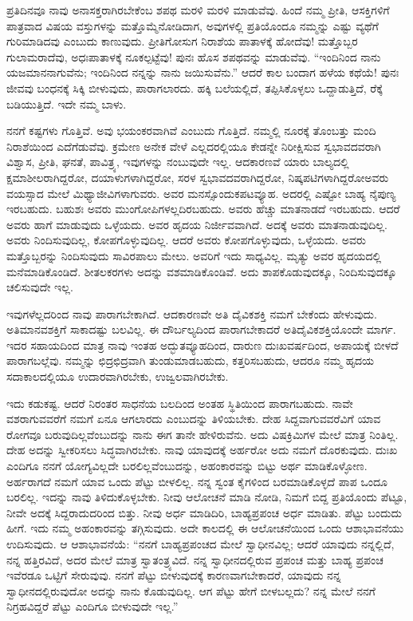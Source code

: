 ಪ್ರತಿದಿನವೂ ನಾವು ಅನಾಸಕ್ತರಾಗಿರಬೇಕೆಂಬ ಶಪಥ ಮರಳಿ ಮರಳಿ ಮಾಡುವೆವು. ಹಿಂದೆ ನಮ್ಮ ಪ್ರೀತಿ, ಆಸಕ್ತಿಗಳಿಗೆ ಪಾತ್ರವಾದ ವಿಷಯ ವಸ್ತುಗಳನ್ನು ಮತ್ತೊಮ್ಮೆ\break ನೋಡಿದಾಗ, ಅವುಗಳಲ್ಲಿ ಪ್ರತಿಯೊಂದೂ ನಮ್ಮನ್ನು ಎಷ್ಟು ವ್ಯಥೆಗೆ ಗುರಿಮಾಡಿದವು ಎಂಬುದು ಕಾಣುವುದು. ಪ್ರೀತಿಗೋಸುಗ ನಿರಾಶೆಯ ಪಾತಾಳಕ್ಕೆ ಹೋದೆವು! ಮತ್ತೊಬ್ಬರ ಗುಲಾಮರಾದೆವು, ಅಧಃಪಾತಾಳಕ್ಕೆ ನೂಕಲ್ಪಟ್ಟೆವು! ಪುನಃ ಹೊಸ ಶಪಥವನ್ನು ಮಾಡುವೆವು. “ಇಂದಿನಿಂದ ನಾನು ಯಜಮಾನನಾಗುವೆನು; ಇಂದಿನಿಂದ ನನ್ನನ್ನು ನಾನು ಜಯಿಸುವೆನು.'' ಆದರೆ ಕಾಲ ಬಂದಾಗ ಹಳೆಯ ಕಥೆಯೆ! ಪುನಃ ಜೀವವು ಬಂಧನಕ್ಕೆ ಸಿಕ್ಕಿ ಬೀಳುವುದು, ಪಾರಾಗಲಾರದು. ಹಕ್ಕಿ ಬಲೆಯಲ್ಲಿದೆ, ತಪ್ಪಿಸಿಕೊಳ್ಳಲು ಒದ್ದಾಡುತ್ತಿದೆ, ರೆಕ್ಕೆ ಬಡಿಯುತ್ತಿದೆ. ಇದೇ ನಮ್ಮ ಬಾಳು.

ನನಗೆ ಕಷ್ಟಗಳು ಗೊತ್ತಿವೆ. ಅವು ಭಯಂಕರವಾಗಿವೆ ಎಂಬುದು ಗೊತ್ತಿದೆ. ನಮ್ಮಲ್ಲಿ ನೂರಕ್ಕೆ ತೊಂಬತ್ತು ಮಂದಿ ನಿರಾಶೆಯಿಂದ ಎದೆಗೆಡುವೆವು. ಕ್ರಮೇಣ ಅನೇಕ ವೇಳೆ ಎಲ್ಲದರಲ್ಲಿಯೂ ಕೇಡನ್ನೇ ನಿರೀಕ್ಷಿಸುವ ಸ್ವಭಾವದವರಾಗಿ ವಿಶ್ವಾಸ, ಪ್ರೀತಿ, ಘನತೆ, ಪಾವಿತ್ರ್ಯ, ಇವುಗಳನ್ನು ನಂಬುವುದೇ ಇಲ್ಲ. ಆದಕಾರಣವೆ ಯಾರು ಬಾಲ್ಯದಲ್ಲಿ ಕ್ಷಮಾಶೀಲರಾಗಿದ್ದರೋ, ದಯಾಳುಗಳಾಗಿದ್ದರೋ, ಸರಳ ಸ್ವಭಾವದವರಾಗಿದ್ದರೋ, ನಿಷ್ಕಪಟಿಗಳಾಗಿದ್ದರೋ\break ಅವರು ವಯಸ್ಸಾದ ಮೇಲೆ ಮಿಥ್ಯಾಜೀವಿಗಳಾಗುವರು. ಅವರ ಮನಸ್ಸೊಂದು\break ಕಪಟವ್ಯೂಹ. ಅದರಲ್ಲಿ ಎಷ್ಟೋ ಬಾಹ್ಯ ನೈಪುಣ್ಯ ಇರಬಹುದು. ಬಹುಶಃ ಅವರು ಮುಂಗೋಪಿಗಳಲ್ಲದಿರಬಹುದು. ಅವರು ಹೆಚ್ಚು ಮಾತನಾಡದೆ ಇರಬಹುದು. ಆದರೆ ಅವರು ಹಾಗೆ ಮಾಡುವುದು ಒಳ್ಳೆಯದು. ಅವರ ಹೃದಯ ನಿರ್ಜೀವವಾಗಿದೆ. ಅದಕ್ಕೆ ಅವರು ಮಾತನಾಡುವುದಿಲ್ಲ. ಅವರು ನಿಂದಿಸುವುದಿಲ್ಲ, ಕೋಪಗೊಳ್ಳುವುದಿಲ್ಲ. ಆದರೆ ಅವರು ಕೋಪಗೊಳ್ಳುವುದು, ಒಳ್ಳೆಯದು. ಅವರು ಮತ್ತೊಬ್ಬರನ್ನು ನಿಂದಿಸುವುದು ಸಾವಿರಪಾಲು ಮೇಲು. ಅವರಿಗೆ ಇದು ಸಾಧ್ಯವಿಲ್ಲ. ಮೃತ್ಯು ಅವರ ಹೃದಯದಲ್ಲಿ ಮನೆಮಾಡಿಕೊಂಡಿದೆ. ಶೀತಲಕರಗಳು ಅದನ್ನು ವಶಮಾಡಿಕೊಂಡಿವೆ. ಅದು ಶಾಪಕೊಡುವುದಕ್ಕೂ, ನಿಂದಿಸುವುದಕ್ಕೂ ಚಲಿಸುವುದೇ ಇಲ್ಲ.

ಇವುಗಳೆಲ್ಲದರಿಂದ ನಾವು ಪಾರಾಗಬೇಕಾಗಿದೆ. ಆದಕಾರಣವೇ ಅತಿ ದೈವಿಕಶಕ್ತಿ ನಮಗೆ ಬೇಕೆಂದು ಹೇಳುವುದು. ಅತಿಮಾನವಶಕ್ತಿಗೆ ಸಾಕಾದಷ್ಟು ಬಲವಿಲ್ಲ. ಈ ದೌರ್ಬಲ್ಯದಿಂದ ಪಾರಾಗಬೇಕಾದರೆ ಅತಿದೈವಿಕಶಕ್ತಿಯೊಂದೇ ಮಾರ್ಗ. ಇದರ ಸಹಾಯದಿಂದ ಮಾತ್ರ ನಾವು ಇಂತಹ ಅದ್ಭುತವ್ಯೂಹದಿಂದ, ದಾರುಣ ದುಃಖವರ್ಷದಿಂದ, ಅಪಾಯಕ್ಕೆ ಬೀಳದೆ ಪಾರಾಗಬಲ್ಲೆವು. ನಮ್ಮನ್ನು ಛಿದ್ರಛಿದ್ರವಾಗಿ ತುಂಡುಮಾಡಬಹುದು, ಕತ್ತರಿಸಬಹುದು, ಆದರೂ ನಮ್ಮ ಹೃದಯ ಸದಾಕಾಲದಲ್ಲಿಯೂ ಉದಾರವಾಗಿರಬೇಕು, ಉಜ್ವಲವಾಗಿರಬೇಕು.

ಇದು ಕಡುಕಷ್ಟ. ಆದರೆ ನಿರಂತರ ಸಾಧನೆಯ ಬಲದಿಂದ ಅಂತಹ ಸ್ಥಿತಿಯಿಂದ ಪಾರಾಗಬಹುದು. ನಾವೇ ವಶರಾಗುವವರೆಗೆ ನಮಗೆ ಏನೂ ಆಗಲಾರದು ಎಂಬುದನ್ನು ತಿಳಿಯಬೇಕು. ದೇಹ ಸಿದ್ದವಾಗುವವರೆವಿಗೆ ಯಾವ ರೋಗವೂ ಬರುವುದಿಲ್ಲವೆಂಬುದನ್ನು ನಾನು ಈಗ ತಾನೇ ಹೇಳಿರುವೆನು. ಅದು ವಿಷಕ್ರಿಮಿಗಳ ಮೇಲೆ ಮಾತ್ರ ನಿಂತಿಲ್ಲ. ದೇಹ ಅದನ್ನು ಸ್ವೀಕರಿಸಲು ಸಿದ್ಧವಾಗಿರಬೇಕು. ನಾವು ಯಾವುದಕ್ಕೆ ಅರ್ಹರೋ ಅದು ನಮಗೆ ದೊರಕುವುದು. ದುಃಖ ಎಂದಿಗೂ ನನಗೆ ಯೋಗ್ಯವಿಲ್ಲದೇ ಬರಲಿಲ್ಲವೆಂಬುದನ್ನು, ಅಹಂಕಾರವನ್ನು ಬಿಟ್ಟು ಅರ್ಥ ಮಾಡಿಕೊಳ್ಳೋಣ. ಅರ್ಹರಾಗದೆ ನಮಗೆ ಯಾವ ಒಂದು ಪೆಟ್ಟು ಬೀಳಲಿಲ್ಲ. ನನ್ನ ಸ್ವಂತ ಕೈಗಳಿಂದ ಬರಮಾಡಿಕೊಳ್ಳದೆ ಪಾಪ ಒಂದೂ ಬರಲಿಲ್ಲ. ಇದನ್ನು ನಾವು ತಿಳಿದುಕೊಳ್ಳಬೇಕು. ನೀವು ಆಲೋಚನೆ ಮಾಡಿ ನೋಡಿ, ನಿಮಗೆ ಬಿದ್ದ ಪ್ರತಿಯೊಂದು ಪೆಟ್ಟೂ, ನೀವೇ ಅದಕ್ಕೆ ಸಿದ್ದರಾದುದರಿಂದ ಬಿತ್ತು. ನೀವು ಅರ್ಧ ಮಾಡಿದಿರಿ, ಬಾಹ್ಯಪ್ರಪಂಚ ಅರ್ಧ ಮಾಡಿತು. ಪೆಟ್ಟು ಬಂದುದು ಹೀಗೆ. ಇದು ನಮ್ಮ ಅಹಂಕಾರವನ್ನು ತಗ್ಗಿಸುವುದು. ಅದೇ ಕಾಲದಲ್ಲಿ ಈ ಆಲೋಚನೆಯಿಂದ ಒಂದು ಆಶಾಭಾವನೆಯು ಉದಿಸುವುದು. ಆ ಆಶಾಭಾವನೆಯೆ: “ನನಗೆ ಬಾಹ್ಯಪ್ರಪಂಚದ ಮೇಲೆ ಸ್ವಾಧೀನವಿಲ್ಲ; ಆದರೆ ಯಾವುದು ನನ್ನಲ್ಲಿದೆ, ನನ್ನ ಹತ್ತಿರವಿದೆ, ಅದರ ಮೇಲೆ ಮಾತ್ರ ಸ್ವಾತಂತ್ರ್ಯವಿದೆ. ನನ್ನ ಸ್ವಾಧೀನದಲ್ಲಿರುವ ಪ್ರಪಂಚ ಮತ್ತು ಬಾಹ್ಯ ಪ್ರಪಂಚ ಇವೆರಡೂ ಒಟ್ಟಿಗೆ ಸೇರುವುವು. ನನಗೆ ಪೆಟ್ಟು ಬೀಳುವುದಕ್ಕೆ ಕಾರಣವಾಗಬೇಕಾದರೆ, ಯಾವುದು ನನ್ನ ಸ್ವಾಧೀನದಲ್ಲಿರುವುದೋ ಅದನ್ನು ನಾನು ಕೊಡುವುದಿಲ್ಲ. ಆಗ ಪೆಟ್ಟು ಹೇಗೆ ಬೀಳಬಲ್ಲದು? ನನ್ನ ಮೇಲೆ ನನಗೆ ನಿಗ್ರಹವಿದ್ದರೆ ಪೆಟ್ಟು ಎಂದಿಗೂ ಬೀಳುವುದೇ ಇಲ್ಲ.”

